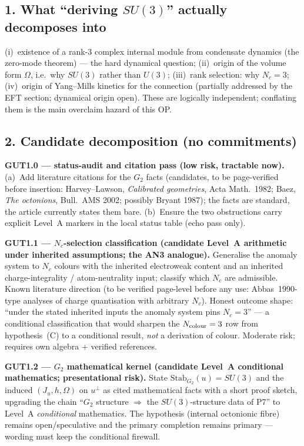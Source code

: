 \subsection*{1. What ``deriving $SU(3)$'' actually decomposes into}
(i)~existence of a rank-3 complex internal module from condensate
dynamics (the zero-mode theorem) --- the hard dynamical question;
(ii)~origin of the volume form $\Omega$, i.e.\ why $SU(3)$ rather
than $U(3)$;
(iii)~rank selection: why $N_c=3$;
(iv)~origin of Yang--Mills kinetics for the connection (partially
addressed by the EFT section; dynamical origin open).
These are logically independent; conflating them is the main
overclaim hazard of this OP.

\subsection*{2. Candidate decomposition (no commitments)}
\textbf{GUT1.0 --- status-audit and citation pass (low risk,
tractable now).}
(a)~Add literature citations for the $G_2$ facts
(candidates, to be page-verified before insertion:
Harvey--Lawson, \emph{Calibrated geometries}, Acta Math.\ 1982;
Baez, \emph{The octonions}, Bull.\ AMS 2002; possibly
Bryant 1987); the facts are standard, the article currently states
them bare.
(b)~Ensure the two obstructions carry explicit Level~A markers in
the local status table (echo pass only).

\textbf{GUT1.1 --- $N_c$-selection classification (candidate
Level~A arithmetic under inherited assumptions; the AN3 analogue).}
Generalise the anomaly system to $N_c$ colours with the inherited
electroweak content and an inherited charge-integrality /
atom-neutrality input; classify which $N_c$ are admissible.
Known literature direction (to be verified page-level before any
use: Abbas~1990-type analyses of charge quantisation with arbitrary
$N_c$).
Honest outcome shape: ``under the stated inherited inputs the
anomaly system pins $N_c=3$'' --- a conditional classification that
would sharpen the $N_{\rm colour}=3$ row from hypothesis~(C) to a
conditional result, \emph{not} a derivation of colour.
Moderate risk; requires own algebra + verified references.

\textbf{GUT1.2 --- $G_2$ mathematical kernel (candidate Level~A
conditional mathematics; presentational risk).}
State $\mathrm{Stab}_{G_2}(u)=SU(3)$ and the induced
$(J_u,h,\Omega)$ on $u^\perp$ as cited mathematical facts with a
short proof sketch, upgrading the chain
``$G_2$ structure $\Rightarrow$ the $SU(3)$-structure data of P7''
to Level~A \emph{conditional} mathematics.
The hypothesis (internal octonionic fibre) remains open/speculative
and the primary completion remains primary --- wording must keep
the conditional firewall.

